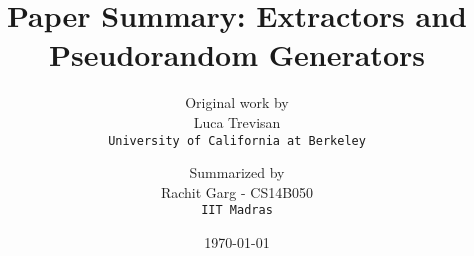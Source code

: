 \documentclass[11pt]{article}
\title{Paper Summary: Extractors and Pseudorandom Generators}
\author{Original work by \\ Luca Trevisan \\ \texttt{University of California at Berkeley} \and Summarized by \\ Rachit Garg - CS14B050 \\ \texttt{IIT Madras}}
\date{\today}
\theoremstyle{plain}%
\theoremstyle{definition}
\begin{document}
\maketitle
\tableofcontents

%








{}
%
%
\end{document}
